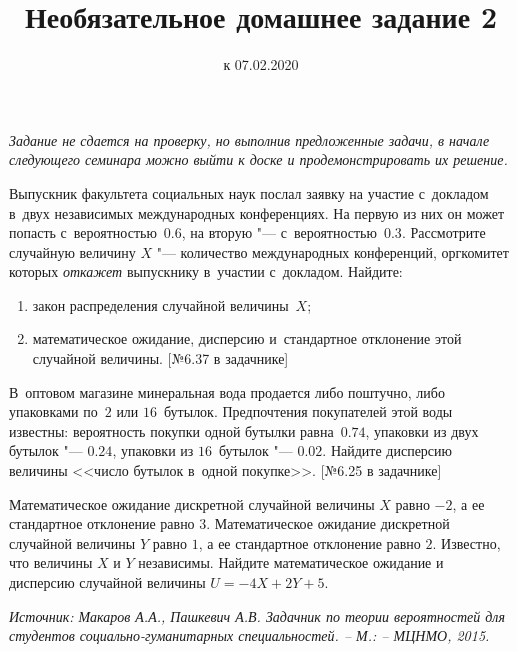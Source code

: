 \documentclass[a4paper, 12pt]{article}
\title{Необязательное домашнее задание 2}
\date{к 07.02.2020}
\begin{document}
\noindent\textit{Задание не сдается на проверку, но выполнив предложенные задачи, в начале 
следующего семинара можно выйти к доске и продемонстрировать их решение.}

\begin{problem}
Выпускник факультета
социальных наук послал заявку на участие с~докладом в~двух
независимых международных конференциях. На первую из них он может
попасть с~вероятностью~$0.6$, на вторую "---
с~вероятностью~$0.3$. Рассмотрите случайную величину $X$ "---
количество международных конференций, оргкомитет которых
\textit{откажет} выпускнику в~участии с~докладом. Найдите: 
\begin{enumerate}
\item закон распределения случайной величины~$X$;
\item математическое ожидание,
дисперсию и~стандартное отклонение этой случайной величины. [№6.37 в задачнике]
\end{enumerate}
\end{problem}

\begin{problem}
В~оптовом магазине минеральная вода
продается либо поштучно, либо упаковками по~$2$ или $16$~бутылок.
Предпочтения покупателей этой воды известны: вероятность покупки
одной бутылки равна~$0.74$, упаковки из двух бутылок "---
$0.24$, упаковки из $16$~бутылок "--- $0.02$. Найдите
дисперсию величины <<число бутылок в~одной покупке>>. [№6.25 в задачнике]
\end{problem}

\begin{problem}
Математическое ожидание дискретной случайной величины $X$ 
равно $-2$, а ее стандартное отклонение равно $3$. 
Математическое ожидание дискретной случайной величины $Y$ 
равно $1$, а ее стандартное отклонение равно $2$. 
Известно, что величины $X$ и $Y$ независимы. 
Найдите математическое ожидание и дисперсию случайной 
величины $U = -4X + 2Y + 5$.
\end{problem}

\noindent\textit{Источник: Макаров А.А., Пашкевич А.В. Задачник по теории вероятностей для 
студентов социально-гуманитарных специальностей. -- М.: -- МЦНМО, 2015.}
\end{document}
